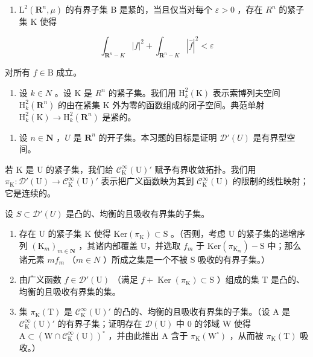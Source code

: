 \begin{enumerate}
\def\labelenumi{\alph{enumi})}
\tightlist
\item
  \(\mathrm{L}^{2}(\mathbf{R}^{n},\mu)\) 的有界子集 B 是紧的，当且仅当对每个 \(\varepsilon>0\) ，存在 \(R^{n}\) 的紧子集 K 使得
\end{enumerate}

\[
\int_ {\mathbf {R} ^ {n} - K} | f | ^ {2} + \int_ {\mathbf {R} ^ {n} - K} | \widehat {f} | ^ {2} <   \varepsilon
\]

对所有 \(f\in \mathrm{B}\) 成立。

\begin{enumerate}
\def\labelenumi{\alph{enumi})}
\setcounter{enumi}{1}
\tightlist
\item
  设 \(k \in N\) 。设 K 是 \(R^{n}\) 的紧子集。我们用 \(\mathrm{H}_{k}^{2}(\mathrm{K})\) 表示索博列夫空间 \(\mathrm{H}_{k}^{2}(\mathbf{R}^{n})\) 的由在紧集 K 外为零的函数组成的闭子空间。典范单射 \(\mathrm{H}_{k}^{2}(\mathrm{K}) \to \mathrm{H}_{k}^{2}(\mathbf{R}^{n})\) 是紧的。
\end{enumerate}

\begin{enumerate}
\def\labelenumi{\arabic{enumi})}
\setcounter{enumi}{17}
\tightlist
\item
  设 \(n \in \mathbf{N}\) ，\(U\) 是 \(\mathbf{R}^n\) 的开子集。本习题的目标是证明 \(\mathcal{D}'(U)\) 是有界型空间。
\end{enumerate}

若 K 是 U 的紧子集，我们给 \(\mathcal{C}_{\mathrm{K}}^{\infty}(\mathrm{U})'\) 赋予有界收敛拓扑。我们用 \(\pi_{\mathrm{K}}\colon\mathcal{D}'(\mathrm{U})\to\mathcal{C}_{\mathrm{K}}^{\infty}(\mathrm{U})'\) 表示把广义函数映为其到 \(\mathcal{C}_{\mathrm{K}}^{\infty}(\mathrm{U})\) 的限制的线性映射；它是连续的。

设 \(S \subset \mathcal{D}'(U)\) 是凸的、均衡的且吸收有界集的子集。

\begin{enumerate}
\def\labelenumi{\alph{enumi})}
\item
  存在 U 的紧子集 K 使得 \(\mathrm{Ker}(\pi_{\mathrm{K}}) \subset \mathrm{S}\) 。（否则，考虑 U 的紧子集的递增序列 \((\mathrm{K}_{m})_{m \in \mathbf{N}}\) ，其诸内部覆盖 U，并选取 \(f_{m}\) 于 \(\mathrm{Ker}(\pi_{\mathrm{K}_{m}}) - \mathrm{S}\) 中；那么诸元素 \(mf_{m}\) （\(m \in N\) ）所成之集是一个不被 S 吸收的有界子集。）
\item
  由广义函数 \(f \in \mathcal{D}'(\mathrm{U})\) （满足 \(f + \operatorname{Ker}(\pi_{\mathrm{K}}) \subset \mathrm{S}\) ）组成的集 T 是凸的、均衡的且吸收有界集的集。
\item
  集 \(\pi_{\mathrm{K}}(\mathrm{T})\) 是 \(\mathcal{C}_{\mathrm{K}}^{\infty}(\mathrm{U})'\) 的凸的、均衡的且吸收有界集的子集。（设 A 是 \(\mathcal{C}_{\mathrm{K}}^{\infty}(\mathrm{U})'\) 的有界子集；证明存在 \(\mathcal{D}(\mathrm{U})\) 中 0 的邻域 W 使得 \(\mathrm{A} \subset (\mathrm{W} \cap \mathcal{C}_{\mathrm{K}}^{\infty}(\mathrm{U}))^{\circ}\) ，并由此推出 A 含于 \(\pi_{\mathrm{K}}(\mathrm{W}^{\circ})\) ，从而被 \(\pi_{\mathrm{K}}(\mathrm{T})\) 吸收。）
\end{enumerate}


